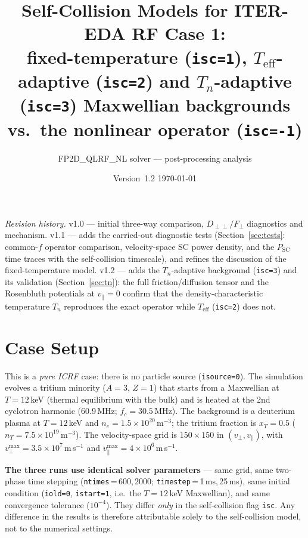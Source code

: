 \documentclass[11pt,a4paper]{article}
\title{%
  Self-Collision Models for ITER-EDA RF Case 1:\\
  fixed-temperature (\texttt{isc=1}), $T_\text{eff}$-adaptive (\texttt{isc=2})
  and $T_n$-adaptive (\texttt{isc=3}) Maxwellian backgrounds\\
  vs.\ the nonlinear operator (\texttt{isc=-1})
}
\author{FP2D\_QLRF\_NL solver --- post-processing analysis}
\date{Version~1.2 \quad\textbullet\quad \today}
\begin{document}
\maketitle
\tableofcontents
\bigskip

\noindent\emph{Revision history.}\;
v1.0 --- initial three-way comparison, $D_{\perp\perp}/F_\perp$ diagnostics and
mechanism.\;
v1.1 --- adds the carried-out diagnostic tests (Section~\ref{sec:tests}:
common-$f$ operator comparison, velocity-space SC power density, and the
$P_\text{SC}$ time traces with the self-collision timescale), and refines the
discussion of the fixed-temperature model.\;
v1.2 --- adds the $T_n$-adaptive background (\texttt{isc=3}) and its validation
(Section~\ref{sec:tn}): the full friction/diffusion tensor and the Rosenbluth
potentials at $v_\parallel=0$ confirm that the density-characteristic
temperature $T_n$ reproduces the exact operator while $T_\text{eff}$
(\texttt{isc=2}) does not.
\bigskip

\section{Case Setup}

This is a \emph{pure ICRF} case: there is no particle source
(\texttt{isource=0}). The simulation evolves a tritium minority ($A=3$, $Z=1$)
that starts from a Maxwellian at $T = 12$\,keV (thermal equilibrium with the
bulk) and is heated at the 2nd cyclotron harmonic (60.9\,MHz; $f_c=30.5$\,MHz).
The background is a deuterium plasma at $T = 12$\,keV and
$n_e = 1.5\times10^{20}$\,m$^{-3}$; the tritium fraction is $x_T = 0.5$
($n_T = 7.5\times10^{19}$\,m$^{-3}$). The velocity-space
grid is $150\times150$ in $(v_\perp, v_\parallel)$, with
$v_\perp^{\max} = 3.5\times10^{7}$\,m\,s$^{-1}$ and
$v_\parallel^{\max} = 4\times10^{6}$\,m\,s$^{-1}$.

\textbf{The three runs use identical solver parameters} --- same grid, same
two-phase time stepping (\texttt{ntimes}\,=\,600,\,2000;
\texttt{timestep}\,=\,1\,ms,\,25\,ms), same initial condition
(\texttt{iold=0}, \texttt{istart=1}, i.e.\ the $T=12$\,keV Maxwellian), and
same convergence tolerance ($10^{-4}$). They differ \emph{only} in the
self-collision flag \texttt{isc}. Any difference in the results is therefore
attributable solely to the self-collision model, not to the numerical
settings.
\end{document}
